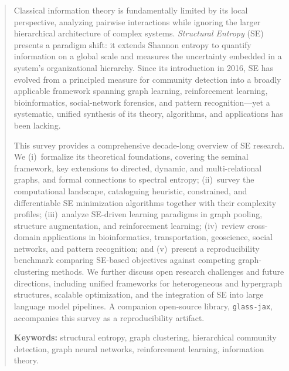 \begin{abstract}
Classical information theory is fundamentally limited by its local perspective,
analyzing pairwise interactions while ignoring the larger hierarchical
architecture of complex systems.
\emph{Structural Entropy} (SE) presents a paradigm shift: it extends Shannon
entropy to quantify information on a global scale and measures the uncertainty
embedded in a system's organizational hierarchy.
Since its introduction in 2016, SE has evolved from a principled measure for
community detection into a broadly applicable framework spanning graph learning,
reinforcement learning, bioinformatics, social-network forensics, and pattern
recognition---yet a systematic, unified synthesis of its theory, algorithms,
and applications has been lacking.

This survey provides a comprehensive decade-long overview of SE research.
We (i)~formalize its theoretical foundations, covering the seminal framework,
key extensions to directed, dynamic, and multi-relational graphs, and formal
connections to spectral entropy;
(ii)~survey the computational landscape, cataloguing heuristic, constrained,
and differentiable SE minimization algorithms together with their complexity
profiles;
(iii)~analyze SE-driven learning paradigms in graph pooling, structure
augmentation, and reinforcement learning;
(iv)~review cross-domain applications in bioinformatics, transportation,
geoscience, social networks, and pattern recognition;
and (v)~present a reproducibility benchmark comparing SE-based objectives
against competing graph-clustering methods.
We further discuss open research challenges and future directions, including
unified frameworks for heterogeneous and hypergraph structures, scalable
optimization, and the integration of SE into large language model pipelines.
A companion open-source library, \texttt{glass-jax}, accompanies this survey
as a reproducibility artifact.

\medskip\noindent\textbf{Keywords:} structural entropy, graph clustering,
hierarchical community detection, graph neural networks, reinforcement learning,
information theory.
\end{abstract}

